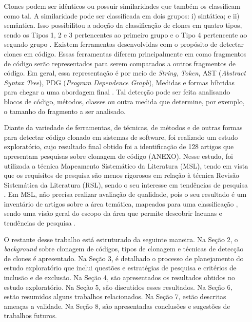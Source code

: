 Clones podem ser idênticos ou possuir similaridades que também os classificam como tal. A similaridade pode ser classificada em dois grupos: i) sintática; e ii) semântica. Isso possibilitou a adoção da classificação de clones em quatro tipos, sendo os Tipos 1, 2 e 3 pertencentes ao primeiro grupo e o Tipo 4 pertencente ao segundo grupo \cite{Yuki2017}. Existem ferramentas desenvolvidas com o propósito de detectar clones em código. Essas ferramentas diferem principalmente em como fragmentos de código serão representados para serem comparados a outros fragmentos de código. Em geral, essa representação é por meio de \textit{String}, \textit{Token}, AST (\textit{Abstract Syntax Tree}), PDG (\textit{Program Dependence Graph}), Medidas e formas híbridas para chegar a uma abordagem final \cite{Schugerl2011}. Tal detecção pode ser feita analisando blocos de código, métodos, classes ou outra medida que determine, por exemplo, o tamanho do fragmento a ser analisado.

Diante da variedade de ferramentas, de técnicas, de métodos e de outras formas para detectar código clonado em sistemas de software, foi realizado um estudo exploratório, cujo resultado final obtido foi a identificação de 128 artigos que apresentam pesquisas sobre clonagem de código (ANEXO). Nesse estudo, foi utilizada a técnica Mapeamento Sistemático da Literatura (MSL), tendo em vista que os requisitos de pesquisa são menos rigorosos em relação à técnica Revisão Sistemática da Literatura (RSL), sendo o seu interesse em tendências de pesquisa \cite{kitchenham2010}. Em MSL, não precisa realizar avaliação de qualidade, pois o seu resultado é um inventário de artigos sobre a área temática, mapeados para uma classificação \cite{wieringa2006}, sendo uma visão geral do escopo da área que permite descobrir lacunas e tendências de pesquisa \cite{petersen2008}.

O restante desse trabalho está estruturado da seguinte maneira. Na Seção 2, o \textit{background} sobre clonagem de códigos, tipos de clonagem e técnicas de detecção de clones é apresentado. Na Seção 3, é detalhado o processo de planejamento do estudo exploratório que inclui questões e estratégias de pesquisa e critérios de inclusão e de exclusão. Na Seção 4, são apresentados os resultados obtidos no estudo exploratório. Na Seção 5, são discutidos esses resultados. Na Seção 6, estão resumidos alguns trabalhos relacionados. Na Seção 7, estão descritas ameaças a validade. Na Seção 8, são apresentadas conclusões e sugestões de trabalhos futuros.

